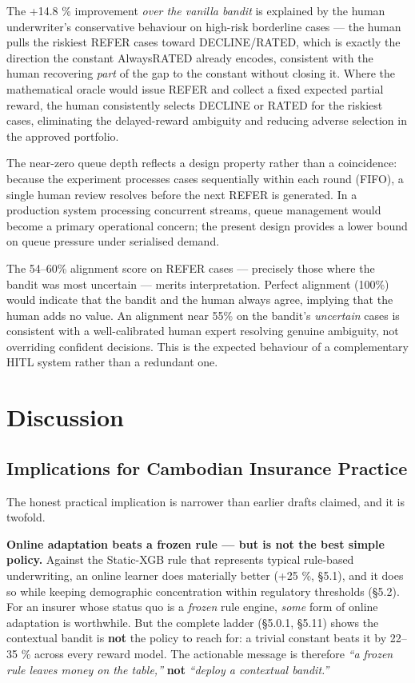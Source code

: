 The +14.8 \% improvement \emph{over the vanilla bandit} is explained by the human underwriter's conservative behaviour on high-risk borderline cases --- the human pulls the riskiest REFER cases toward DECLINE/RATED, which is exactly the direction the constant AlwaysRATED already encodes, consistent with the human recovering \emph{part} of the gap to the constant without closing it. Where the mathematical oracle would issue REFER and collect a fixed expected partial reward, the human consistently selects DECLINE or RATED for the riskiest cases, eliminating the delayed-reward ambiguity and reducing adverse selection in the approved portfolio.

The near-zero queue depth reflects a design property rather than a coincidence: because the experiment processes cases sequentially within each round (FIFO), a single human review resolves before the next REFER is generated. In a production system processing concurrent streams, queue management would become a primary operational concern; the present design provides a lower bound on queue pressure under serialised demand.

The 54--60\% alignment score on REFER cases --- precisely those where the bandit was most uncertain --- merits interpretation. Perfect alignment (100\%) would indicate that the bandit and the human always agree, implying that the human adds no value. An alignment near 55\% on the bandit's \emph{uncertain} cases is consistent with a well-calibrated human expert resolving genuine ambiguity, not overriding confident decisions. This is the expected behaviour of a complementary HITL system rather than a redundant one.

\section{Discussion}\label{discussion}

\subsection{Implications for Cambodian Insurance Practice}\label{implications-for-cambodian-insurance-practice}

The honest practical implication is narrower than earlier drafts claimed, and it is twofold.

\textbf{Online adaptation beats a frozen rule --- but is not the best simple policy.} Against the Static-XGB rule that represents typical rule-based underwriting, an online learner does materially better (+25 \%, §5.1), and it does so while keeping demographic concentration within regulatory thresholds (§5.2). For an insurer whose status quo is a \emph{frozen} rule engine, \emph{some} form of online adaptation is worthwhile. But the complete ladder (§5.0.1, §5.11) shows the contextual bandit is \textbf{not} the policy to reach for: a trivial constant beats it by 22--35 \% across every reward model. The actionable message is therefore \emph{``a frozen rule leaves money on the table,''} \textbf{not} \emph{``deploy a contextual bandit.''}

